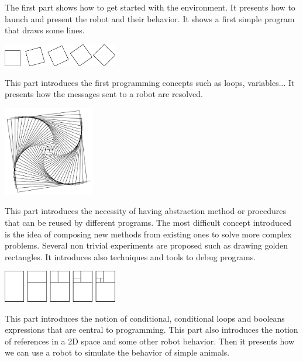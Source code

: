 \begin{description}
\item{}
The first part shows how to get started with the environment. It presents how to launch \sq and present the robot and their behavior. It shows a first simple program that draws some lines.
\begin{center}
\includegraphics[width=5cm]{ChTurntitlePicture}
\end{center}
\item{}
This part introduces the first programming concepts such as loops, variables... It presents how the messages sent to a robot are resolved. 
\begin{center}
\includegraphics[width=4cm]{varLoopsTitle}
\end{center}
\item{} This part introduces the necessity of having abstraction \ie method or procedures that can be reused by different programs. The most difficult concept introduced is the idea of composing new methods from existing ones to solve more complex problems. Several non trivial experiments are proposed such as drawing golden rectangles. It introduces also techniques and tools to debug programs. 
\begin{center}
\includegraphics[width=5cm]{nborsteps}
\end{center}
\item{} This part introduces the notion of conditional, conditional loops and booleans expressions that are central to programming. This part also introduces the notion of references in a 2D space and some other robot behavior. Then it presents how we can use a robot to simulate the behavior of simple animals. 

\end{description}
